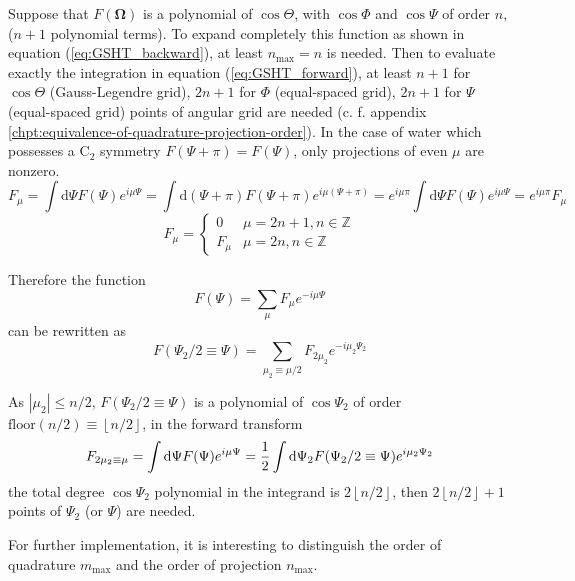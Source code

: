 Suppose that $F(\mathbf{\Omega})$ is a polynomial of $\cos\Theta$, with
$\cos\Phi$ and $\cos\Psi$ of order $n$, ($n+1$ polynomial terms).
To expand completely this function as shown in equation (\ref{eq:GSHT_backward}),
at least $n_{\mathrm{max}}=n$ is needed. Then to evaluate exactly
the integration in equation (\ref{eq:GSHT_forward}), at least $n+1$
for $\cos\Theta$ (Gauss-Legendre grid), $2n+1$ for $\Phi$ (equal-spaced
grid), $2n+1$ for $\Psi$ (equal-spaced grid) points of angular grid
are needed (c. f. appendix \ref{chpt:equivalence-of-quadrature-projection-order}).
In the case of water which possesses a $\mathrm{C}_{2}$ symmetry $F(\Psi+\pi)=F(\Psi)$,
only projections of even $\mu$ are nonzero.
\begin{equation}
F_{\mu}=\int\mathrm{d}\Psi F(\Psi)e^{i\mu\Psi}=\int\mathrm{d}(\Psi+\pi)F(\Psi+\pi)e^{i\mu(\Psi+\pi)}=e^{i\mu\pi}\int\mathrm{d}\Psi F(\Psi)e^{i\mu\Psi}=e^{i\mu\pi}F_{\mu}
\end{equation}
\begin{equation}
F_{\mu}=\begin{cases}
0 & \mu=2n+1,n\in\mathbb{Z}\\
F_{\mu} & \mu=2n,n\in\mathbb{Z}
\end{cases}
\end{equation}


Therefore the function
\begin{equation}
F(\Psi)=\sum_{\mu}F_{\mu}e^{-i\mu\Psi}
\end{equation}
can be rewritten as
\begin{equation}
F(\Psi_{2}/2\equiv\Psi)=\sum_{\mu_{2}\equiv\mu/2}F_{2\mu_{2}}e^{-i\mu_{2}\Psi_{2}}
\end{equation}


As $\left|\mu_{2}\right|\leq n/2$, $F(\Psi_{2}/2\equiv\Psi)$ is
a polynomial of $\cos\Psi_{2}$ of order $\mathrm{floor}(n/2)\equiv\left\lfloor n/2\right\rfloor $,
in the forward transform
\begin{equation}
F_{2\mu_{2}\equiv\mu}=\intop\mathrm{d}\Psi F(\Psi)e^{i\mu\Psi}=\frac{1}{2}\intop\mathrm{d}\Psi_{2}F(\Psi_{2}/2\equiv\Psi)e^{i\mu_{2}\Psi_{2}}
\end{equation}
the total degree $\cos\Psi_{2}$ polynomial in the integrand is $2\left\lfloor n/2\right\rfloor $,
then $2\left\lfloor n/2\right\rfloor +1$ points of $\Psi_{2}$ (or
$\Psi$) are needed. 

For further implementation, it is interesting to distinguish the order
of quadrature $m_{\mathrm{max}}$ and the order of projection $n_{\mathrm{max}}$.


